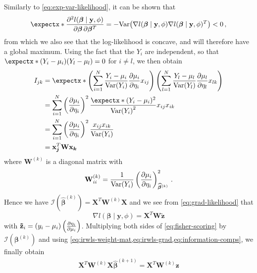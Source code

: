 \documentclass[a4paper]{book}
\begin{document}
Similarly to \cref{eq:exp-var-likelihood}, it can be shown that
\begin{equation}
  \expect{\pdv{l(\bm{\beta} \mid \mathbf{y}, \phi)}{\bm{\beta}, \bm{\beta}^T}} = -\var{\nabla l(\bm{\beta} \mid \mathbf{y}, \phi) \nabla l(\bm{\beta} \mid \mathbf{y}, \phi)^T} < 0 \,,
\end{equation}
from which we also see that the log-likelihood is concave, and will therefore have a global maximum. Using the fact that the $Y_i$ are independent, so that $\expect{(Y_i - \mu_i)(Y_l - \mu_l)} = 0$ for $i \neq l$, we then obtain
\begin{align}
  I_{jk} & = \expect{\left( \sum_{i = 1}^N \frac{Y_i - \mu_i}{\var{Y_i}} \pdv{\mu_i}{\eta_i} x_{ij}\right) \left( \sum_{l = 1}^N \frac{Y_l - \mu_l}{\var{Y_l}} \frac{\partial \mu_l}{\partial \eta_l} x_{lk} \right)} \\
         & = \sum_{i = 1}^N \left( \pdv{\mu_i}{\eta_i} \right)^2 \frac{\expect{(Y_i - \mu_i)^2}}{\var{Y_i}^2} x_{ij} x_{ik}                                                                                           \\
         & = \sum_{i = 1}^N \left( \pdv{\mu_i}{\eta_i} \right)^2 \frac{x_{ij} x_{ik}}{\var{Y_i}}                                                                                                                      \\
         & = \bm{\mathrm{x}_j}^T \mathbf{W} \bm{\mathrm{x}_k} \label{eq:information-comps}
\end{align}
where $\mathbf{W}^{(k)}$ is a diagonal matrix with
\begin{equation} \label{eq:irwls-weight-mat}
  \mathbf{W}^{(k)}_{ii} = \frac{1}{\var{Y_i}} \pdv{\mu_i}{\eta_i}_{\bm{\widehat{\beta}}^{(k)}}^2 \,.
\end{equation}
Hence we have $\mathcal{I}(\bm{\widehat{\beta}}^{(k)}) = \mathbf{X}^T \mathbf{W}^{(k)} \mathbf{X}$ and we see from \cref{eq:grad-likelihood} that
\begin{equation} \label{eq:irwls-grad}
  \nabla l(\bm{\beta} \mid \mathbf{y}, \phi) = \mathbf{X}^T \mathbf{W} \mathbf{\tilde{z}}
\end{equation}
with $\mathbf{\tilde{z}}_i = (y_i - \mu_i) \left( \pdv{\eta_i}{\mu_i} \right)$. Multiplying both sides of \ref{eq:fisher-scoring} by $\mathcal{I}(\bm{\beta}^{(k)})$ and using \cref{eq:irwls-weight-mat,eq:irwls-grad,eq:information-comps}, we finally obtain
\begin{align} \label{eq:irwls-iter}
  \mathbf{X}^T \mathbf{W}^{(k)} \mathbf{X} \bm{\widehat{\beta}}^{(k + 1)} =  \mathbf{X}^T \mathbf{W}^{(k)} \mathbf{z}
\end{align}
\end{document}
